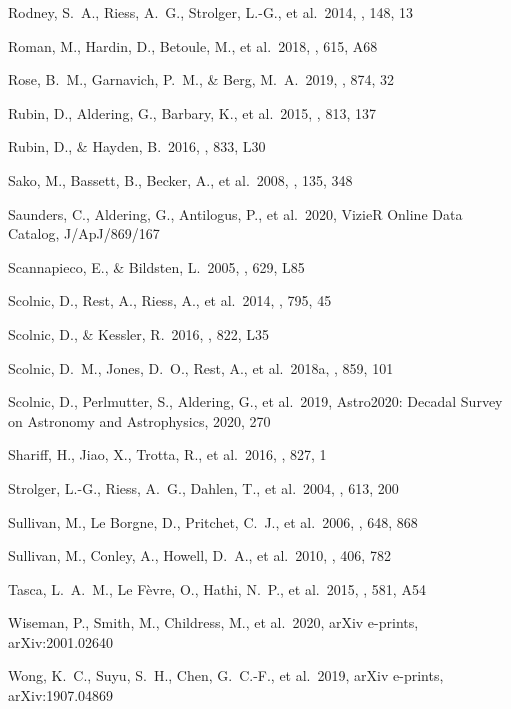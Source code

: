 \documentclass[]{aa} %
\begin{document}
\begin{thebibliography}{}
 Rodney, S.~A.,
  Riess, A.~G., Strolger, L.-G., et al.\ 2014, \aj, 148, 13 
  
 Roman, M., Hardin, D., Betoule, M., et al.\ 2018, \aap, 615, A68

 Rose, B.~M., Garnavich, P.~M., \& Berg, M.~A.\ 2019, \apj, 874, 32


 Rubin, D., Aldering, G., Barbary, K., et al.\ 2015, \apj, 813, 137

 Rubin, D., \& Hayden, B.\ 2016, \apjl, 833, L30


 Sako, M., Bassett, B., Becker, A., et al.\ 2008, \aj, 135, 348

 Saunders, C., Aldering, G., Antilogus, P., et al.\ 2020, VizieR Online Data Catalog, J/ApJ/869/167

 Scannapieco, E., \& Bildsten, L.\ 2005, \apjl, 629, L85 

 Scolnic, D., Rest, A., Riess, A., et al.\ 2014, \apj, 795, 45

 Scolnic, D., \& Kessler, R.\ 2016, \apjl, 822, L35


 Scolnic, D.~M., Jones, D.~O., Rest, A., et al.\ 2018a, \apj, 859, 101


 Scolnic, D., Perlmutter, S., Aldering, G., et al.\ 2019, Astro2020: Decadal Survey on Astronomy and Astrophysics, 2020, 270

 Shariff, H., Jiao, X., Trotta, R., et al.\ 2016, \apj, 827, 1


 Strolger, L.-G., Riess, A.~G., Dahlen, T., et al.\ 2004, \apj, 613, 200

 Sullivan, M., Le  Borgne, D., Pritchet, C.~J., et al.\ 2006, \apj, 648, 868 


 Sullivan, M., Conley, A., Howell, D.~A., et al.\ 2010, \mnras, 406, 782

 Tasca, L.~A.~M., Le F{\`e}vre, O., Hathi, N.~P., et al.\ 2015, \aap, 581, A54

 Wiseman, P., Smith, M., Childress, M., et al.\ 2020, arXiv e-prints, arXiv:2001.02640


 Wong, K.~C., Suyu, S.~H., Chen, G.~C.-F., et al.\ 2019, arXiv e-prints, arXiv:1907.04869


\end{thebibliography}
\end{document}

